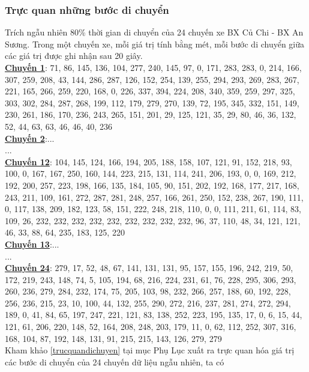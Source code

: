 \documentclass[a4paper, 13pt]{report}
\begin{document}
\subsubsection{Trực quan những bước di chuyển}
Trích ngẫu nhiên 80\% thời gian di chuyển của 24 chuyến xe BX Củ Chi - BX An Sương. Trong một chuyến xe, mỗi giá trị tính bằng mét, mỗi bước di chuyển giữa các giá trị được ghi nhận sau 20 giây.\\
\textbf{\underline{Chuyến 1}}: 
71, 86, 145, 136, 104, 277, 240, 145, 97, 0, 171, 283, 283, 0, 214, 166, 307, 259, 208, 43, 144, 286, 287, 126, 152, 254, 139, 255, 294, 293, 269, 283, 267, 221, 165, 266, 259, 220, 168, 0, 226, 337, 394, 224, 208, 340, 359, 259, 297, 325, 303, 302, 284, 287, 268, 199, 112, 179, 279, 270, 139, 72, 195, 345, 332, 151, 149, 230, 261, 186, 170, 236, 243, 265, 151, 201, 29, 125, 121, 35, 29, 80, 46, 36, 132, 52, 44, 63, 63, 46, 46, 40, 236\\
\textbf{\underline{Chuyến 2}}:...\\
...\\
\textbf{\underline{Chuyến 12}}: 104, 145, 124, 166, 194, 205, 188, 158, 107, 121, 91, 152, 218, 93, 100, 0, 167, 167, 250, 160, 144, 223, 215, 131, 114, 241, 206, 193, 0, 0, 169, 212, 192, 200, 257, 223, 198, 166, 135, 184, 105, 90, 151, 202, 192, 168, 177, 217, 168, 243, 211, 109, 161, 272, 287, 281, 248, 257, 166, 261, 250, 152, 238, 267, 190, 111, 0, 117, 138, 209, 182, 123, 58, 151, 222, 248, 218, 110, 0, 0, 111, 211, 61, 114, 83, 109, 26, 232, 232, 232, 232, 232, 232, 232, 232, 232, 96, 37, 110, 48, 34, 121, 121, 46, 33, 88, 64, 235, 183, 125, 220\\
\textbf{\underline{Chuyến 13}}:...\\
...\\
\textbf{\underline{Chuyến 24}}: 279, 17, 52, 48, 67, 141, 131, 131, 95, 157, 155, 196, 242, 219, 50, 172, 219, 243, 148, 74, 5, 105, 194, 68, 216, 224, 231, 61, 76, 228, 295, 306, 293, 260, 236, 279, 284, 232, 174, 75, 205, 103, 98, 232, 266, 257, 188, 60, 192, 228, 256, 236, 215, 23, 10, 100, 44, 132, 255, 290, 272, 216, 237, 281, 274, 272, 294, 189, 0, 41, 84, 65, 197, 247, 221, 121, 83, 138, 252, 223, 195, 135, 17, 0, 6, 15, 44, 121, 61, 206, 220, 148, 52, 164, 208, 248, 203, 179, 11, 0, 62, 112, 252, 307, 316, 168, 104, 87, 192, 148, 131, 91, 215, 215, 143, 126, 279, 279\\
Kham khảo \ref{trucquandichuyen} tại mục Phụ Lục xuất ra trực quan hóa giá trị các bước di chuyển của 24 chuyến dữ liệu ngẫu nhiên, ta có\\
\end{document}
